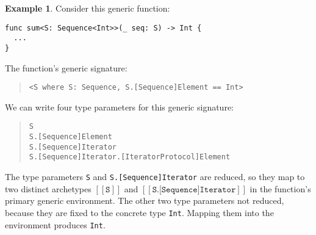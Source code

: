 \documentclass[a4paper,headsepline,bibliography=totoc,toc=flat,fleqn,twoside=semi]{scrbook}
\theoremstyle{definition}
\theoremstyle{definition}
\newtheorem{example}{Example}[chapter]
\theoremstyle{definition}
\newcommand{\archetype}[1]{$[\![\texttt{#1}]\!]$}
\begin{document}
\begin{example}\label{archetypeexample}
Consider this generic function:
\begin{Verbatim}
func sum<S: Sequence<Int>>(_ seq: S) -> Int {
  ...
}
\end{Verbatim}
The function's generic signature:
\begin{quote}
\begin{verbatim}
<S where S: Sequence, S.[Sequence]Element == Int>
\end{verbatim}
\end{quote}
We can write four type parameters for this generic signature:
\begin{quote}
\begin{verbatim}
S
S.[Sequence]Element
S.[Sequence]Iterator
S.[Sequence]Iterator.[IteratorProtocol]Element
\end{verbatim}
\end{quote}
The type parameters \texttt{S} and \texttt{S.[Sequence]Iterator} are reduced, so they map to two distinct archetypes \archetype{S} and \archetype{S.[Sequence]Iterator} in the function's primary generic environment. The other two type parameters not reduced, because they are fixed to the concrete type \texttt{Int}. Mapping them into the environment produces \texttt{Int}.
\end{example}
\end{document}
